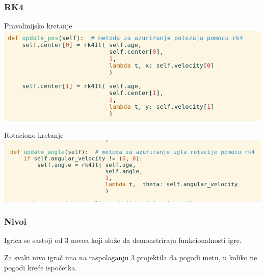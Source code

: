 \documentclass{beamer}
\begin{document}
\begin{frame}
	\frametitle{RK4}
	\begin{center}
		Pravolinijsko kretanje
		\includegraphics[scale=0.3]{./images/rk4pos.png}
		
		\vspace{0.3cm}
		Rotaciono kretanje
		\includegraphics[scale=0.3]{./images/rk4angle.png}
	\end{center}
\end{frame}

\begin{frame}
	\frametitle{Nivoi}
	\Large
	Igrica se sastoji od 3 novoa koji služe da demonstriraju funkcionalnosti igre.
	
	Za svaki nivo igrač ima na raspolaganju 3 projektila da pogodi metu, u koliko ne pogodi kreće ispočetka.
\end{frame}
\end{document}
